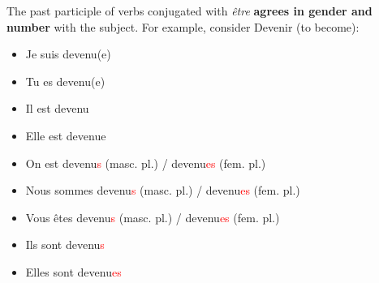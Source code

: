 \documentclass{book}
\begin{document}
The past participle of verbs conjugated with \textit{être} \textbf{agrees in gender and number} with the subject. For example, consider Devenir (to become):
\begin{itemize}
    \item Je suis devenu(e)
    \item Tu es devenu(e)
    \item Il est devenu
    \item Elle est devenue
    \item On est devenu\textcolor{red}{s} (masc. pl.) / devenu\textcolor{red}{es} (fem. pl.)
    \item Nous sommes devenu\textcolor{red}{s} (masc. pl.) / devenu\textcolor{red}{es} (fem. pl.)
    \item Vous êtes devenu\textcolor{red}{s} (masc. pl.) / devenu\textcolor{red}{es} (fem. pl.)
    \item Ils sont devenu\textcolor{red}{s}
    \item Elles sont devenu\textcolor{red}{es}
\end{itemize}
\end{document}
